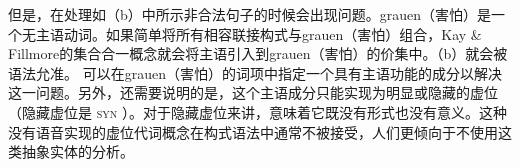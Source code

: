 但是，在处理如（b）中所示非合法句子的时候会出现问题。grauen（害怕）是一个无主语动词。如果简单将所有相容联接构式与grauen（害怕）组合，Kay \& Fillmore的集合合一概念就会将主语引入到grauen（害怕）的价集中。（b）就会被语法允准。
\eal
{}
\zl
可以在grauen（害怕）的词项中指定一个具有主语功能的成分以解决这一问题。另外，还需要说明的是，这个主语成分只能实现为明显或隐藏的虚位（隐藏虚位是 \textsc{syn} ）。对于隐藏虚位来讲，意味着它既没有形式也没有意义。这种没有语音实现的虚位代词概念在构式语法中通常不被接受，人们更倾向于不使用这类抽象实体的分析。


